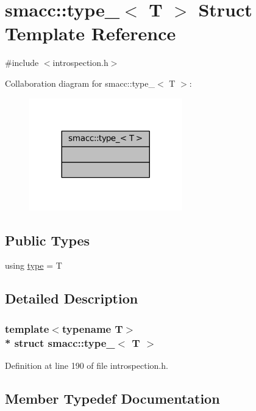 \hypertarget{structsmacc_1_1type__}{}\section{smacc\+:\+:type\+\_\+$<$ T $>$ Struct Template Reference}
\label{structsmacc_1_1type__}


{\ttfamily \#include $<$introspection.\+h$>$}



Collaboration diagram for smacc\+:\+:type\+\_\+$<$ T $>$\+:
\nopagebreak
\begin{figure}[H]
\begin{center}
\leavevmode
\includegraphics[width=188pt]{structsmacc_1_1type____coll__graph}
\end{center}
\end{figure}
\subsection*{Public Types}
\begin{DoxyCompactItemize}
\item 
using \hyperlink{structsmacc_1_1type___a9b8fcdd94d0e9fc71366e867a4094463}{type} = T
\end{DoxyCompactItemize}


\subsection{Detailed Description}
\subsubsection*{template$<$typename T$>$\\*
struct smacc\+::type\+\_\+$<$ T $>$}



Definition at line 190 of file introspection.\+h.



\subsection{Member Typedef Documentation}
